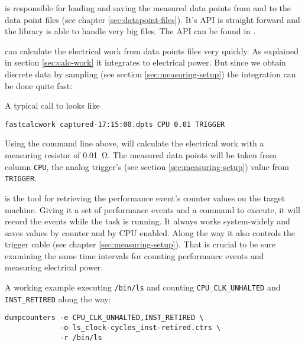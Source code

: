 \label{sec:special-developments}


\JWlfour{\JWTlibdp}

\JWTlibdp{} is responsible for loading and saving the measured data points from
and to the data point files (see chapter \ref{sec:datapoint-files}). It's API is
straight forward and the library is able to handle very big files. The API can
be found in .


\JWlfour{\JWTfcw}

\JWTfcw{} can calculate the electrical work from data points files very quickly.
As explained in section \ref{sec:calc-work} it integrates to electrical power.
But since we obtain discrete data by sampling (see section
\ref{sec:measuring-setup}) the integration can be done quite fast:


A typical call to \JWTfcw{} looks like

\begin{lstlisting}[style=Shell]
fastcalcwork captured-17:15:00.dpts CPU 0.01 TRIGGER
\end{lstlisting}

Using the command line above, \JWTfcw{} will calculate the electrical work with a
measuring resistor of \SI{0.01}{\ohm}. The measured data points will be taken
from column \texttt{CPU}, the analog trigger's (see section
\ref{sec:measuring-setup}) value from \texttt{TRIGGER}.


\JWlfour{\JWTdc}

\JWTdc{} is the tool for retrieving the performance event's counter values on
the target machine. Giving it a set of performance events and a command to
execute, it will record the events while the task is running. It always works
system-widely and saves values by counter and by CPU enabled. Along the way it
also controls the trigger cable (see chapter \ref{sec:measuring-setup}).  That
is crucial to be sure examining the same time intervals for counting performance
events and measuring electrical power.

A working example executing \texttt{/bin/ls} and counting
\texttt{CPU\_CLK\_UNHALTED} and \texttt{INST\_RETIRED} along the way:

\begin{lstlisting}[style=Shell]
dumpcounters -e CPU_CLK_UNHALTED,INST_RETIRED \
             -o ls_clock-cycles_inst-retired.ctrs \
             -r /bin/ls
\end{lstlisting}

